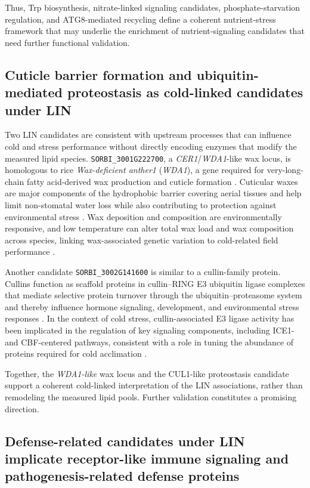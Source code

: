 \documentclass[9pt,twocolumn,twoside]{rilabRxiv}
\begin{document}
Thus, Trp biosynthesis, nitrate-linked signaling candidates, phosphate-starvation regulation, and ATG8-mediated recycling define a coherent nutrient-stress framework that may underlie the enrichment of nutrient-signaling candidates that need further functional validation.


\subsection{Cuticle barrier formation and ubiquitin-mediated proteostasis as cold-linked candidates under LIN}

Two LIN candidates are consistent with upstream processes that can influence cold and stress performance without directly encoding enzymes that modify the measured lipid species. \texttt{SORBI\_3001G222700}, a \textit{CER1}/\textit{WDA1}-like wax locus, is homologous to rice \textit{Wax-deficient anther1} (\textit{WDA1}), a gene required for very-long-chain fatty acid-derived wax production and cuticle formation \citep{Jung2006WDA1, Gladman2022SorghumBase}. Cuticular waxes are major components of the hydrophobic barrier covering aerial tissues and help limit non-stomatal water loss while also contributing to protection against environmental stress \citep{Jung2006WDA1,LeeSuh2022}. Wax deposition and composition are environmentally responsive, and low temperature can alter total wax load and wax composition across species, linking wax-associated genetic variation to cold-related field performance \citep{LeeSuh2022}.

Another candidate \texttt{SORBI\_3002G141600} is similar to a cullin-family protein. Cullins function as scaffold proteins in cullin--RING E3 ubiquitin ligase complexes that mediate selective protein turnover through the ubiquitin--proteasome system and thereby influence hormone signaling, development, and environmental stress responses \citep{WangXie2024Cullin}. In the context of cold stress, cullin-associated E3 ligase activity has been implicated in the regulation of key signaling components, including ICE1- and CBF-centered pathways, consistent with a role in tuning the abundance of proteins required for cold acclimation \citep{WangXie2024Cullin}.

Together, the \textit{WDA1-like} wax locus and the CUL1-like proteostasis candidate support a coherent cold-linked interpretation of the LIN associations, rather than remodeling the measured lipid pools. Further validation constitutes a promising direction.

\subsection{Defense-related candidates under LIN implicate receptor-like immune signaling and pathogenesis-related defense proteins}
\end{document}
